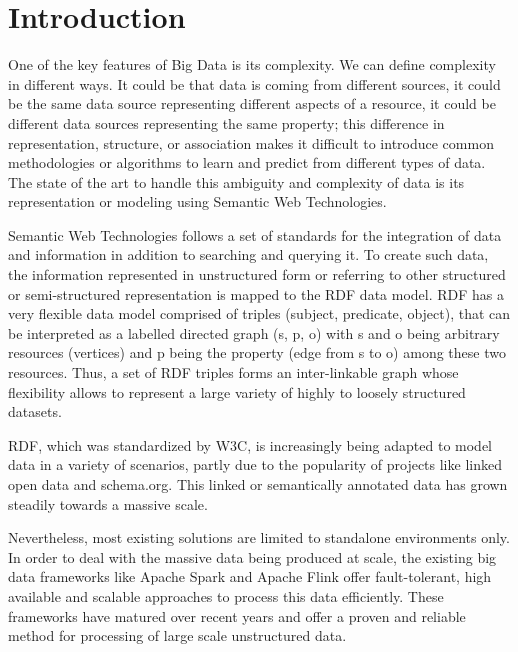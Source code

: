 \chapter{Introduction}
\label{chapter:intro}
One of the key features of Big Data is its complexity. 
We can define complexity in different ways.
It could be that data is coming from different sources, it could be the same data source representing different aspects of a resource, it could be different data sources representing the same property; this difference in representation, structure, or association makes it difficult to introduce common methodologies or algorithms to learn and predict from different types of data. 
The state of the art to handle this ambiguity and complexity of data is its representation or modeling using Semantic Web Technologies.

Semantic Web Technologies follows a set of standards for the integration of data and information in addition to searching and querying it. 
To create such data, the information represented in unstructured form or referring to other structured or semi-structured representation is mapped to the \gls{RDF} data model. 
\gls{RDF} has a very flexible data model comprised of triples (subject, predicate, object), that can be interpreted as a labelled directed graph (s, p, o) with s and o being arbitrary resources (vertices) and p being the property (edge from s to o) among these two resources. 
Thus, a set of \gls{RDF} triples forms an inter-linkable graph whose flexibility allows to represent a large variety of highly to loosely structured datasets. 

\gls{RDF}, which was standardized by \gls{W3C}, is increasingly being adapted to model data in a variety of scenarios, partly due to the popularity of projects like linked open data and schema.org. 
This linked or semantically annotated data has grown steadily towards a massive scale.

Nevertheless, most existing solutions are limited to standalone environments only.
In order to deal with the massive data being produced at scale, the existing big data frameworks like Apache Spark and Apache Flink offer fault-tolerant, high available and scalable approaches to process this data efficiently. 
These frameworks have matured over recent years and offer a proven and reliable method for processing of large scale unstructured data.


